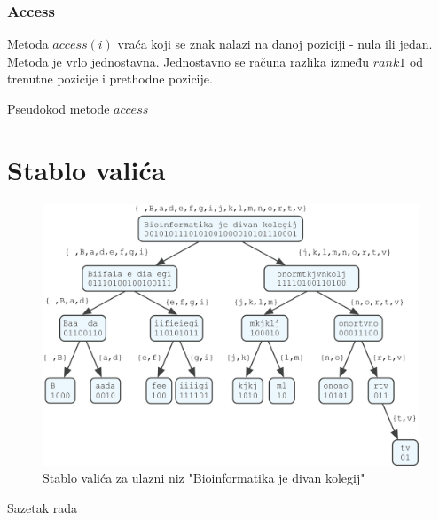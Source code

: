 \documentclass[times, utf8, seminar, numeric]{fer}
\begin{document}
\subsection{Access}
Metoda $access(i)$ vraća koji se znak nalazi na danoj poziciji - nula ili jedan. Metoda je vrlo jednostavna. Jednostavno se računa razlika između $rank1$ od trenutne pozicije i prethodne pozicije.

\begin{algorithm}[H]
 \caption{Pseudokod metode $access$}
\end{algorithm}


\chapter{Stablo valića}
\begin{figure}[ht]
	\centering
	\includegraphics[width=\textwidth]{img/wavelet_tree_example.png}
	\caption{Stablo valića za ulazni niz "Bioinformatika je divan kolegij"}
	\label{fig:wavelet-tree-example}
\end{figure}






\begin{sazetak}
Sazetak rada

\end{sazetak}
\end{document}

